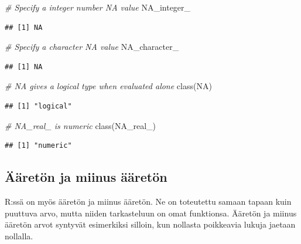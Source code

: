 \documentclass[
]{book}
\newenvironment{Shaded}{\begin{snugshade}}{\end{snugshade}}
\newcommand{\CommentTok}[1]{\textcolor[rgb]{0.56,0.35,0.01}{\textit{#1}}}
\newcommand{\ConstantTok}[1]{\textcolor[rgb]{0.00,0.00,0.00}{#1}}
\newcommand{\FunctionTok}[1]{\textcolor[rgb]{0.00,0.00,0.00}{#1}}
\newcommand{\NormalTok}[1]{#1}
\begin{document}
\begin{Shaded}
\begin{Highlighting}[]
\CommentTok{\# Specify a integer number NA value}
\ConstantTok{NA\_integer\_}
\end{Highlighting}
\end{Shaded}

\begin{verbatim}
## [1] NA
\end{verbatim}

\begin{Shaded}
\begin{Highlighting}[]
\CommentTok{\# Specify a character NA value}
\ConstantTok{NA\_character\_}
\end{Highlighting}
\end{Shaded}

\begin{verbatim}
## [1] NA
\end{verbatim}

\begin{Shaded}
\begin{Highlighting}[]
\CommentTok{\# NA gives a logical type when evaluated alone}
\FunctionTok{class}\NormalTok{(}\ConstantTok{NA}\NormalTok{)}
\end{Highlighting}
\end{Shaded}

\begin{verbatim}
## [1] "logical"
\end{verbatim}

\begin{Shaded}
\begin{Highlighting}[]
\CommentTok{\# NA\_real\_ is numeric}
\FunctionTok{class}\NormalTok{(}\ConstantTok{NA\_real\_}\NormalTok{)}
\end{Highlighting}
\end{Shaded}

\begin{verbatim}
## [1] "numeric"
\end{verbatim}

\hypertarget{uxe4uxe4retuxf6n-ja-miinus-uxe4uxe4retuxf6n}{%
\subsection{Ääretön ja miinus ääretön}\label{uxe4uxe4retuxf6n-ja-miinus-uxe4uxe4retuxf6n}}

R:ssä on myös ääretön ja miinus ääretön. Ne on toteutettu samaan tapaan kuin puuttuva arvo, mutta niiden tarkasteluun on omat funktionsa. Ääretön ja miinus ääretön arvot syntyvät esimerkiksi silloin, kun nollasta poikkeavia lukuja jaetaan nollalla.
\end{document}
